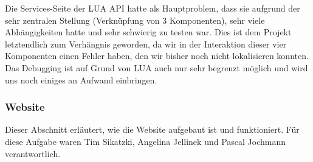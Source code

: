 Die Services-Seite der LUA API hatte als Hauptproblem, dass sie aufgrund der sehr zentralen Stellung (Verknüpfung von 3 Komponenten), sehr viele Abhängigkeiten hatte und sehr schwierig zu testen war. Dies ist dem Projekt letztendlich zum Verhängnis geworden, da wir in der Interaktion dieser vier Komponenten einen Fehler haben, den wir bisher noch nicht lokalisieren konnten. Das Debugging ist auf Grund von LUA auch nur sehr begrenzt möglich und wird uns noch einiges an Aufwand einbringen.

\subsubsection{Website}
\label{sec:services-website}
Dieser Abschnitt erläutert, wie die Website aufgebaut ist und funktioniert. Für diese Aufgabe waren Tim Sikatzki, Angelina Jellinek und Pascal Jochmann verantwortlich.

